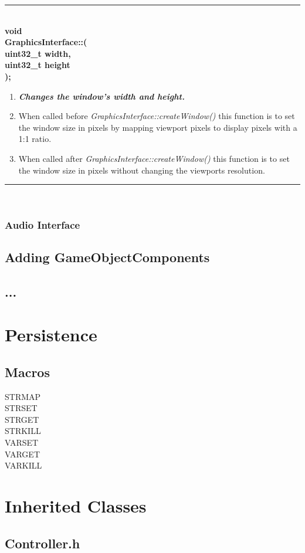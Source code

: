 \documentclass[12pt]{article}
\newcommand{\param}[1]{\indent\phantom{indent} \textbf{#1}\\ }
\newenvironment{func}[4]%
{%
	\noindent\ignorespaces
	\begin{minipage}[b]{\linewidth}
	\rule{\textwidth} {1pt} \\
	\textbf{#1\\#2::{\Large \color{blue}{#3}}(} \\
	\textbf{#4);} \\
	\noindent\ignorespaces
}%
{%
	\ignorespacesafterend
	\rule{\textwidth} {0.01pt} \\
	\end{minipage}
}
\begin{document}
\begin{func}{void}{GraphicsInterface}{setWindowSize}
{
	\param{uint32\_t width,}
	\param{uint32\_t height}
}
\begin{enumerate}
\item[]\textit{\textbf{Changes the window's width and height.}}
\item When called before \textit{GraphicsInterface::createWindow()} this function is to set the window size in pixels by mapping viewport pixels to display pixels with a 1:1 ratio.
\item When called after \textit{GraphicsInterface::createWindow()} this function is to set the window size in pixels without changing the viewports resolution.
\end{enumerate}
\end{func}

\subsubsection{Audio Interface}
\subsection{Adding GameObjectComponents}
\subsection{...}

\section{Persistence}
\subsection{Macros}
STRMAP\\
STRSET\\
STRGET\\
STRKILL\\
VARSET\\
VARGET\\
VARKILL\\

\section{Inherited Classes}
\subsection{Controller.h}
\end{document}
